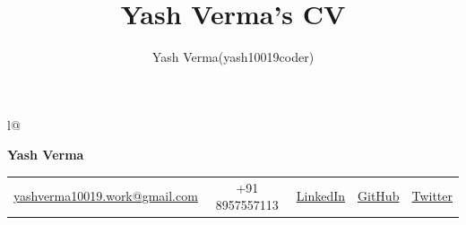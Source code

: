 \documentclass[letterpaper,1pt]{article}
\title{Yash Verma's CV}
\author{Yash Verma(yash10019coder)}
\begin{document}

\begin{tabular*}{\textwidth}{l@{\extracolsep{\fill}}}

      \textbf{{\LARGE Yash Verma}} \vspace{.7em} \\
      \hspace{3.5 mm}

      \hspace{-6mm}
      \begin{tabular}{c|c|c|c|c}
            \faEnvelope  \hspace{0.5mm} \href{mailto:yashverma10019.work@gmail.com}{yashverma10019.work@gmail.com}
            \hspace{1mm} & \hspace{1mm}

            \faPhone  \hspace{0.5mm} +91 8957557113
            \hspace{1mm} & \hspace{1mm}
            \faLinkedin\hspace{0.5mm}\href{https://www.linkedin.com/in/yash10019coder/}{LinkedIn}
            \hspace{1mm} & \hspace{1mm}
            \faGithub \hspace{0.5mm} \href{https://github.com/yash10019coder/}{GitHub} \hspace{1mm}
                         & \hspace{1mm}
            \faTwitter \hspace{0.5mm} \href{https://twitter.com/yash10019coder}{Twitter} \\
      \end{tabular}
\end{tabular*}
\end{document}

